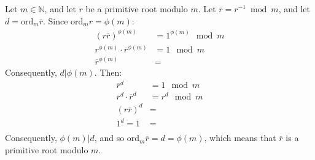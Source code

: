 \documentclass{article}
\begin{document}
\clearpage
\problem{}
Let $m \in \mathbb{N}$, and let $r$ be a primitive root modulo $m$. Let $\overline{r} = r^{-1} \bmod m$, and let $d = \mathrm{ord}_m \overline{r}$. Since $\mathrm{ord}_m r = \phi(m)$:
\begin{align*}
    {(r\overline{r})}^{\phi(m)} & = 1^{\phi(m)} \mod m \\
    r^{\phi(m)} \cdot \overline{r}^{\phi(m)} & = 1 \mod m \\
    \overline{r}^{\phi(m)} & =
\end{align*}
Consequently, $d | \phi(m)$. Then:
\begin{align*}
    \overline{r}^d & = 1 \mod m \\
    r^d \cdot \overline{r}^d & = r^d \mod m \\
    {(r\overline{r})}^d & = \\
    1^d = 1 & = \\
\end{align*}
Consequently, $\phi(m) | d$, and so $\mathrm{ord}_m \overline{r} = d = \phi(m)$, which means that $\overline{r}$ is a primitive root modulo $m$.
\end{document}
